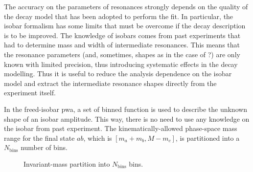 The accuracy on the parameters of resonances strongly depends on the quality of the decay model that has been adopted to perform the fit.
In particular, the isobar formalism has some limits that must be overcome if the decay description is to be improved.
The knowledge of isobars comes from past experiments that had to determine mass and width of intermediate resonances.
This means that the resonance parameters (and, sometimes, shapes as in the case of ?) are only known with limited precision, thus introducing systematic effects in the decay modelling.
Thus it is useful to reduce the analysis dependence on the isobar model and extract the intermediate resonance shapes directly from the experiment itself.


In the freed-isobar \ac{pwa}, a set of binned function is used to describe the unknown shape of an isobar amplitude.
This way, there is no need to use any knowledge on the isobar from past experiment.
The kinematically-allowed phase-space mass range for the final state $ab$, which is $[m_a + m_b, M - m_c]$, is partitioned into a $N_\text{bins}$ number of bins.
\begin{figure}
    \centering
    \caption{Invariant-mass partition into $N_\text{bins}$ bins.}
    \label{fig:invariant-mass-partition}
\end{figure}
